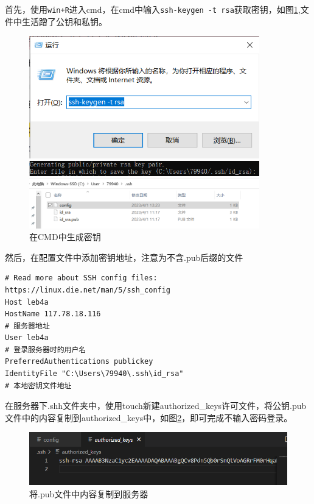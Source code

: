 首先，使用\lstinline{win+R}进入cmd，在cmd中输入\lstinline{ssh-keygen -t rsa}获取密钥，如图\ref{vs-ssh-miyao},文件中生活蹭了公钥和私钥。
\begin{figure}[ht]
    \centering
    \begin{minipage}[c]{0.9\textwidth}
        \centering
        \includegraphics[width=10cm]{image/env/ssh-miyao.png}
    \end{minipage}

    \begin{minipage}[c]{0.9\textwidth}
        \centering
        \includegraphics[width=10cm]{image/env/ssh-miyao2.png}
    \end{minipage}

    \begin{minipage}[c]{0.9\textwidth}
        \centering
        \includegraphics[width=10cm]{image/env/ssh-miyao3.png}
    \end{minipage}

    \caption{在CMD中生成密钥}
    \label{vs-ssh-miyao}
\end{figure}

然后，在配置文件中添加密钥地址，注意为不含.pub后缀的文件
\begin{lstlisting}
# Read more about SSH config files: https://linux.die.net/man/5/ssh_config
Host leb4a
HostName 117.78.18.116
# 服务器地址
User leb4a
# 登录服务器时的用户名
PreferredAuthentications publickey
IdentityFile "C:\Users\79940\.ssh\id_rsa"
# 本地密钥文件地址
\end{lstlisting}

在服务器下.shh文件夹中，使用touch新建authorized\_keys许可文件，将公钥.pub文件中的内容复制到authorized\_keys中，如图\ref{.pub}，即可完成不输入密码登录。
\begin{figure}[ht]
    \centering
    \includegraphics[width=13cm]{image/env/ssh-miyao-fuwuqi.png}
    \caption{将.pub文件中内容复制到服务器}
    \label{.pub}
\end{figure}


